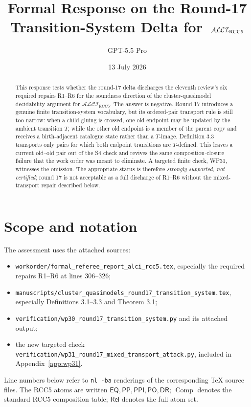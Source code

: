\documentclass[11pt]{article}
\title{Formal Response on the Round-17 Transition-System Delta for\
\texorpdfstring{$\ALCIRCC$}{ALCI_RCC5}}
\author{GPT-5.5 Pro}
\date{13 July 2026}
\newcommand{\ALCIRCC}{\mathcal{ALCI}_{\mathrm{RCC5}}}
\newcommand{\EQ}{\mathsf{EQ}}
\newcommand{\PP}{\mathsf{PP}}
\newcommand{\PPI}{\mathsf{PPI}}
\newcommand{\PO}{\mathsf{PO}}
\newcommand{\DR}{\mathsf{DR}}
\newcommand{\Rel}{\mathsf{Rel}}
\newcommand{\Comp}{\operatorname{Comp}}
\newcommand{\code}[1]{\texttt{#1}}
\begin{document}
\maketitle

\begin{abstract}
This response tests whether the round-17 delta discharges the eleventh review's six required repairs R1--R6 for the soundness direction of the cluster-quasimodel decidability argument for $\ALCIRCC$.  The answer is negative.  Round 17 introduces a genuine finite transition-system vocabulary, but its ordered-pair transport rule is still too narrow: when a child gluing is crossed, one old endpoint may be updated by the ambient transition $T$, while the other old endpoint is a member of the parent copy and receives a birth-adjacent catalogue state rather than a $T$-image.  Definition 3.3 transports only pairs for which both endpoint transitions are $T$-defined.  This leaves a current old--old pair out of the S4 check and revives the same composition-closure failure that the work order was meant to eliminate.  A targeted finite check, WP31, witnesses the omission.  The appropriate status is therefore \emph{strongly supported, not certified}; round 17 is not acceptable as a full discharge of R1--R6 without the mixed-transport repair described below.
\end{abstract}

\tableofcontents

\section{Scope and notation}

The assessment uses the attached sources:
\begin{itemize}
  \item \code{workorder/formal\_referee\_report\_alci\_rcc5.tex}, especially the required repairs R1--R6 at lines 306--326;
  \item \code{manuscripts/cluster\_quasimodels\_round17\_transition\_system.tex}, especially Definitions 3.1--3.3 and Theorem 3.1;
  \item \code{verification/wp30\_round17\_transition\_system.py} and its attached output;
  \item the new targeted check \code{verification/wp31\_round17\_mixed\_transport\_attack.py}, included in Appendix~\ref{app:wp31}.
\end{itemize}
Line numbers below refer to \code{nl -ba} renderings of the corresponding \TeX{} source files.  The RCC5 atoms are written $\EQ,\PP,\PPI,\PO,\DR$; $\Comp$ denotes the standard RCC5 composition table; $\Rel$ denotes the full atom set.
\end{document}
